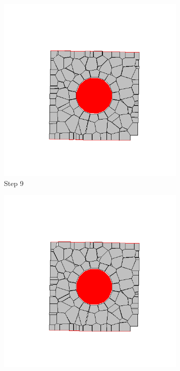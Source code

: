 \begin{figure}[ht!]
      \begin{subfigure}{.25\textwidth}
        \centering
        \includegraphics[width=1.0\linewidth]{Files/Small_ASR/CR/DEP5-STEP(009).png}
      \caption{Step 9}
      \end{subfigure}%
      \begin{subfigure}{.25\textwidth}
        \centering
        \includegraphics[width=1.0\linewidth]{Files/Small_ASR/CR/DEP5-STEP(010).png}

\end{subfigure}
\end{figure}
